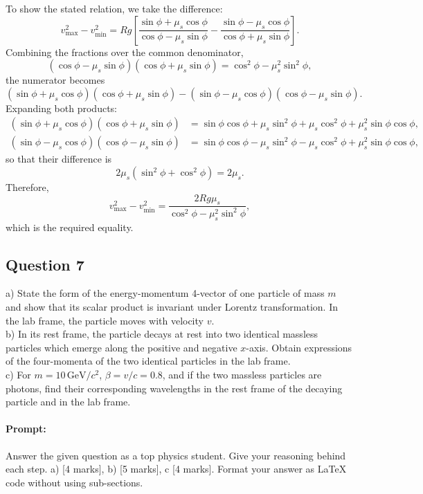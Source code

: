 \documentclass{article}
\begin{document}
\begin{enumerate}
    To show the stated relation, we take the difference:
    \[
    v_{\max}^2 - v_{\min}^2 = Rg\left[\frac{\sin\phi+\mu_s\cos\phi}{\cos\phi-\mu_s\sin\phi} - \frac{\sin\phi-\mu_s\cos\phi}{\cos\phi+\mu_s\sin\phi}\right].
    \]
    Combining the fractions over the common denominator,
    \[
    (\cos\phi-\mu_s\sin\phi)(\cos\phi+\mu_s\sin\phi)=\cos^2\phi-\mu_s^2\sin^2\phi,
    \]
    the numerator becomes
    \[
    (\sin\phi+\mu_s\cos\phi)(\cos\phi+\mu_s\sin\phi) - (\sin\phi-\mu_s\cos\phi)(\cos\phi-\mu_s\sin\phi).
    \]
    Expanding both products:
    \[
    \begin{aligned}
    (\sin\phi+\mu_s\cos\phi)(\cos\phi+\mu_s\sin\phi) &= \sin\phi\cos\phi + \mu_s\sin^2\phi + \mu_s\cos^2\phi + \mu_s^2\sin\phi\cos\phi, \\
    (\sin\phi-\mu_s\cos\phi)(\cos\phi-\mu_s\sin\phi) &= \sin\phi\cos\phi - \mu_s\sin^2\phi - \mu_s\cos^2\phi + \mu_s^2\sin\phi\cos\phi,
    \end{aligned}
    \]
    so that their difference is
    \[
    2\mu_s\left(\sin^2\phi+\cos^2\phi\right) = 2\mu_s.
    \]
    Therefore,
    \[
    v_{\max}^2 - v_{\min}^2 = \frac{2Rg\mu_s}{\cos^2\phi-\mu_s^2\sin^2\phi},
    \]
    which is the required equality.
\end{enumerate}



\subsection{Question 7}

a) State the form of the energy-momentum 4-vector of one particle of mass \(m\) and show that its scalar product is invariant under Lorentz transformation. In the lab frame, the particle moves with velocity \(v\). \\ 

b) In its rest frame, the particle decays at rest into two identical massless particles which emerge along the positive and negative \(x\)-axis. Obtain expressions of the four-momenta of the two identical particles in the lab frame. \\ 

c) For \(m = 10 \, \text{GeV}/c^2\), \(\beta = v/c = 0.8\), and if the two massless particles are photons, find their corresponding wavelengths in the rest frame of the decaying particle and in the lab frame. \\

\paragraph{Prompt: \\} 
Answer the given question as a top physics student. Give your reasoning behind each step. a) [4 marks], b) [5 marks], c [4 marks].
Format your answer as LaTeX code without using sub-sections.
\end{document}
